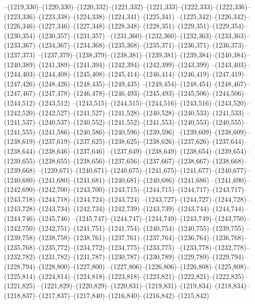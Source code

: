 --(1219,330)--(1220,330)--(1220,332)--(1221,332)--(1221,333)--(1222,333)--(1222,336)--(1223,336)--(1223,338)--(1224,338)--(1224,341)--(1225,341)
--(1225,342)--(1226,342)--(1226,346)--(1227,346)--(1227,348)--(1228,348)--(1228,351)--(1229,351)--(1229,354)--(1230,354)--(1230,357)--(1231,357)
--(1231,360)--(1232,360)--(1232,363)--(1233,363)--(1233,367)--(1234,367)--(1234,368)--(1235,368)--(1235,371)--(1236,371)--(1236,373)--(1237,373)
--(1237,379)--(1238,379)--(1238,381)--(1239,381)--(1239,384)--(1240,384)--(1240,389)--(1241,389)--(1241,394)--(1242,394)--(1242,399)--(1243,399)
--(1243,403)--(1244,403)--(1244,408)--(1245,408)--(1245,414)--(1246,414)--(1246,419)--(1247,419)--(1247,426)--(1248,426)--(1248,435)--(1249,435)
--(1249,454)--(1248,454)--(1248,467)--(1247,467)--(1247,478)--(1246,478)--(1246,493)--(1245,493)--(1245,506)--(1244,506)--(1244,512)--(1243,512)
--(1243,515)--(1244,515)--(1244,516)--(1243,516)--(1243,520)--(1242,520)--(1242,527)--(1241,527)--(1241,528)--(1240,528)--(1240,533)--(1241,533)
--(1241,537)--(1240,537)--(1240,552)--(1241,552)--(1241,553)--(1240,553)--(1240,555)--(1241,555)--(1241,586)--(1240,586)--(1240,596)--(1239,596)
--(1239,609)--(1238,609)--(1238,619)--(1237,619)--(1237,625)--(1238,625)--(1238,626)--(1237,626)--(1237,644)--(1238,644)--(1238,646)--(1237,646)
--(1237,649)--(1238,649)--(1238,654)--(1239,654)--(1239,655)--(1238,655)--(1238,656)--(1237,656)--(1237,667)--(1238,667)--(1238,668)--(1239,668)
--(1239,671)--(1240,671)--(1240,675)--(1241,675)--(1241,677)--(1240,677)--(1240,680)--(1241,680)--(1241,681)--(1240,681)--(1240,686)--(1241,686)
--(1241,690)--(1242,690)--(1242,700)--(1243,700)--(1243,715)--(1244,715)--(1244,717)--(1243,717)--(1243,718)--(1244,718)--(1244,724)--(1243,724)
--(1243,727)--(1244,727)--(1244,728)--(1243,728)--(1243,734)--(1242,734)--(1242,739)--(1243,739)--(1243,744)--(1244,744)--(1244,746)--(1245,746)
--(1245,747)--(1244,747)--(1244,749)--(1243,749)--(1243,750)--(1242,750)--(1242,751)--(1241,751)--(1241,754)--(1240,754)--(1240,755)--(1239,755)
--(1239,758)--(1238,758)--(1238,761)--(1237,761)--(1237,764)--(1236,764)--(1236,768)--(1235,768)--(1235,772)--(1234,772)--(1234,775)--(1233,775)
--(1233,778)--(1232,778)--(1232,782)--(1231,782)--(1231,787)--(1230,787)--(1230,789)--(1229,789)--(1229,794)--(1228,794)--(1228,800)--(1227,800)
--(1227,806)--(1226,806)--(1226,808)--(1225,808)--(1225,814)--(1224,814)--(1224,818)--(1223,818)--(1223,821)--(1222,821)--(1222,825)--(1221,825)
--(1221,829)--(1220,829)--(1220,831)--(1219,831)--(1219,834)--(1218,834)--(1218,837)--(1217,837)--(1217,840)--(1216,840)--(1216,842)--(1215,842)
